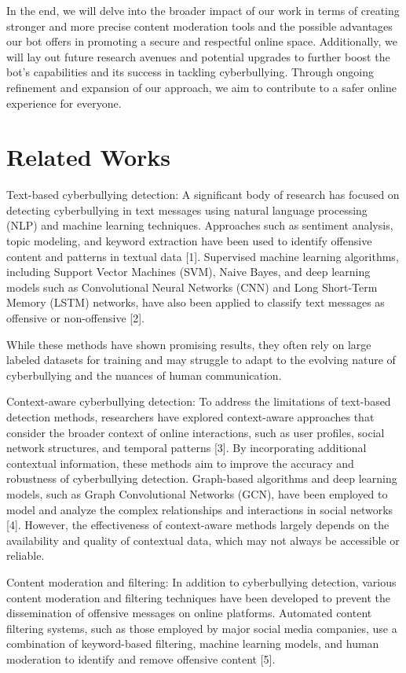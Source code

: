 \documentclass[conference]{IEEEtran}
\begin{document}
In the end, we will delve into the broader impact of our work in terms of creating stronger and more precise content moderation tools and the possible advantages our bot offers in promoting a secure and respectful online space. Additionally, we will lay out future research avenues and potential upgrades to further boost the bot's capabilities and its success in tackling cyberbullying. Through ongoing refinement and expansion of our approach, we aim to contribute to a safer online experience for everyone.

\section{Related Works}



Text-based cyberbullying detection: A significant body of research has focused on detecting cyberbullying in text messages using natural language processing (NLP) and machine learning techniques. Approaches such as sentiment analysis, topic modeling, and keyword extraction have been used to identify offensive content and patterns in textual data [1]. Supervised machine learning algorithms, including Support Vector Machines (SVM), Naive Bayes, and deep learning models such as Convolutional Neural Networks (CNN) and Long Short-Term Memory (LSTM) networks, have also been applied to classify text messages as offensive or non-offensive [2]. 

While these methods have shown promising results, they often rely on large labeled datasets for training and may struggle to adapt to the evolving nature of cyberbullying and the nuances of human communication.

Context-aware cyberbullying detection: To address the limitations of text-based detection methods, researchers have explored context-aware approaches that consider the broader context of online interactions, such as user profiles, social network structures, and temporal patterns [3]. By incorporating additional contextual information, these methods aim to improve the accuracy and robustness of cyberbullying detection. Graph-based algorithms and deep learning models, such as Graph Convolutional Networks (GCN), have been employed to model and analyze the complex relationships and interactions in social networks [4]. However, the effectiveness of context-aware methods largely depends on the availability and quality of contextual data, which may not always be accessible or reliable.

Content moderation and filtering: In addition to cyberbullying detection, various content moderation and filtering techniques have been developed to prevent the dissemination of offensive messages on online platforms. Automated content filtering systems, such as those employed by major social media companies, use a combination of keyword-based filtering, machine learning models, and human moderation to identify and remove offensive content [5].
\end{document}
